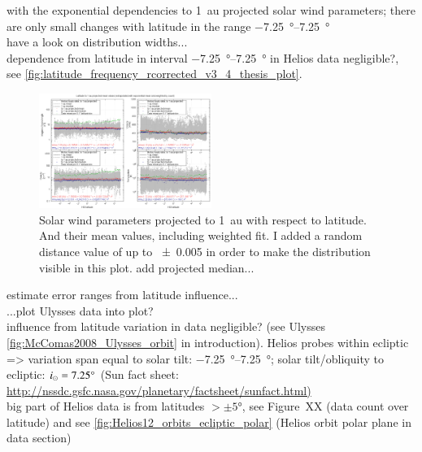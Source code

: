 with the exponential dependencies to 1~au projected solar wind parameters; there are only small changes with latitude in the range \SIrange{-7.25}{7.25}{\degree}\\
have a look on distribution widths...\\

dependence from latitude in interval \SIrange{-7.25}{7.25}{\degree} in Helios data negligible?, see \autoref{fig:latitude_frequency_rcorrected_v3_4_thesis_plot}.\\
\begin{figure}[htb]
	\centering
	\includegraphics[width=0.5\textwidth]{figures_of_mine/gnuplots/latitude_frequency_rcorrected_v3_4_thesis_plot.png}
	\caption{Solar wind parameters projected to 1~au with respect to latitude. And their mean values, including weighted fit. I added a random distance value of up to \SI{+-0.005}{\au} in order to make the distribution visible in this plot. add projected median...}
	\label{fig:latitude_frequency_rcorrected_v3_4_thesis_plot}
\end{figure}
estimate error ranges from latitude influence...\\

...plot Ulysses data into plot?\\

influence from latitude variation in data negligible? (see Ulysses \autoref{fig:McComas2008_Ulysses_orbit} in introduction). Helios probes within ecliptic => variation span equal to solar tilt: \SIrange{-7.25}{7.25}{\degree}; solar tilt/obliquity to ecliptic: $i_\odot = 7.25\degree$ (Sun fact sheet: \url{http://nssdc.gsfc.nasa.gov/planetary/factsheet/sunfact.html)}\\
big part of Helios data is from latitudes $>\pm5$°, see Figure~XX (data count over latitude) and see \autoref{fig:Helios12_orbits_ecliptic_polar} (Helios orbit polar plane in data section)\\

